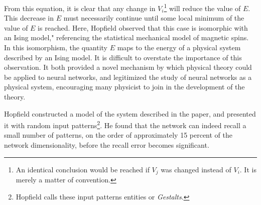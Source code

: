 \documentclass[11pt]{afthesis}
\begin{document}
\begin{equation}
	\end{equation} From this equation, it is clear that any change in \begin{math}V_i\end{math}\footnote{An identical conclusion would be reached if \begin{math}V_j\end{math} was changed instead of  \begin{math}V_i\end{math}. It is merely a matter of convention.} will reduce the value  of \begin{math}E\end{math}. This decrease in \begin{math}E\end{math} must necessarily continue until some local minimum of the value of \begin{math}E\end{math} is reached. Here, Hopfield observed that this case is isomorphic with an Ising model," referencing the statistical mechanical model of magnetic spins. In this isomorphism, the quantity \begin{math}E\end{math} maps to the energy of a physical system described by an Ising model. It is difficult to overstate the importance of this observation. It both provided a novel mechanism by which physical theory could be applied to neural networks, and legitimized the study of neural networks as a physical system, encouraging many physicist to join in the development of the theory.
	
	Hopfield constructed a model of the system described in the paper, and presented it with random input patterns\footnote{Hopfield calls these input patterns entities or \textit{Gestalts}.}. He found that the network can indeed recall a small number of patterns, on the order of approximately 15 percent of the network dimensionality, before the recall error becomes significant.
	
\end{document}
